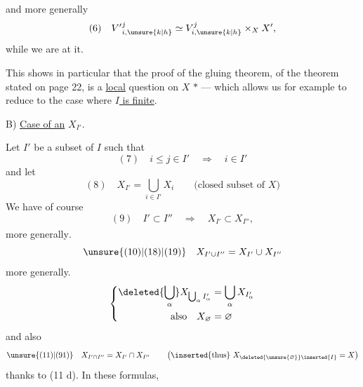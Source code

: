 and more generally
\[
(6)\quad V'{}^{j}_{i,\unsure{k|h}}\simeq V^{j}_{i,\unsure{k|h}}\times_X X',
\]
while we are at it.

This shows in particular that the proof of the gluing theorem, of the theorem stated on page 22, is a \uline{local} question on $X$ \textcircled{$*$} --- which allows us for example to reduce to the case where  \uline{$I$ is finite}.



B) \uline{Case of an} $X_{I'}$. 

Let $I'$ be a subset of $I$ such that
\[
(7)\quad i\leq j\in I'\quad\Longrightarrow\quad i\in I'
\]
and let
\[
(8)\quad X_{I'}=\bigcup_{i\in I'}X_i\qquad\text{(closed subset of $X$)}
\]
We have of course
\[
(9)\quad I'\subset I''\quad\Longrightarrow\quad X_{I'}\subset X_{I''},
\]
more generally\textsuperscript{}.
\[
\unsure{(10)|(18)|(19)}\quad X_{I'\cup I''}=X_{I'}\cup X_{I''}
\]
more generally.
\[
\left\{\begin{aligned}
\deleted{\bigcup_\alpha}X_{\bigcup_\alpha I'_\alpha}&=\bigcup_\alpha X_{I'_\alpha}\\
\text{also}\quad X_{\varnothing}&=\varnothing
\end{aligned}\right.
\]
 and also
\[
\unsure{(11)|(91)}\quad X_{I'\cap I''}=X_{I'}\cap X_{I''}\qquad
\left(\text{\inserted{thus} }X_{\deleted{\unsure{\varnothing}}\inserted{I}}=X\right)
\]
thanks to (11 d). In these formulas,

